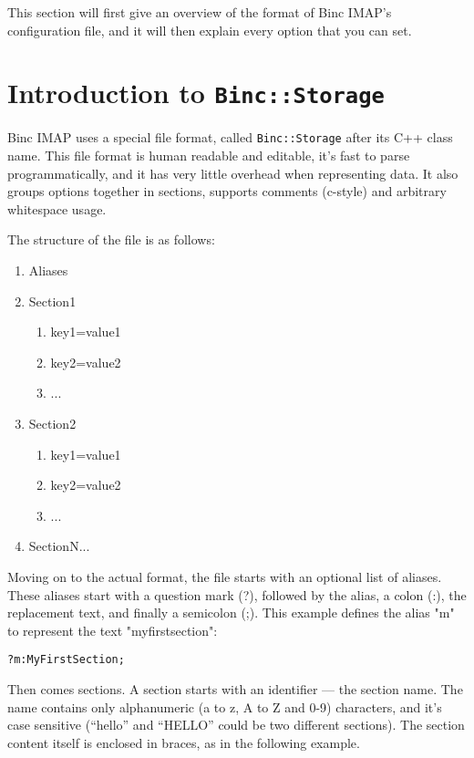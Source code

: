\documentclass[11pt,a4paper,twoside,openright]{report}
\begin{document}
This section will first give an overview of the format of Binc IMAP's
configuration file, and it will then explain every option that you
can set.

\section{Introduction to \texttt{Binc::Storage}}

Binc IMAP uses a special file format, called \texttt{Binc::Storage}
after its C++ class name. This file format is human readable and
editable, it's fast to parse programmatically, and it has very little
overhead when representing data. It also groups options together in
sections, supports comments (c-style) and arbitrary whitespace usage.

The structure of the file is as follows:

\begin{enumerate}
\item Aliases
\item Section1
  \begin{enumerate}
    \item key1=value1
    \item key2=value2
    \item ...
  \end{enumerate}
\item Section2
  \begin{enumerate}
    \item key1=value1
    \item key2=value2
    \item ...
  \end{enumerate}
\item SectionN...
\end{enumerate}
Moving on to the actual format, the file starts with an optional list
of aliases. These aliases start with a question mark (?), followed by
the alias, a colon (:), the replacement text, and finally a semicolon
(;). This example defines the alias "m" to represent the text
"myfirstsection":

\begin{Verbatim}
?m:MyFirstSection;
\end{Verbatim}
Then comes sections. A section starts with an identifier --- the
section name. The name contains only alphanumeric (a to z, A to Z and
0-9) characters, and it's case sensitive (``hello'' and ``HELLO''
could be two different sections). The section content itself is
enclosed in braces, as in the following example.
\end{document}
